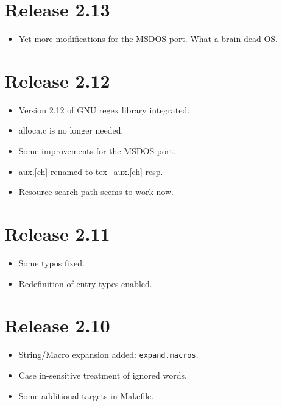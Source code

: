 \documentclass[11pt,a4paper]{scrartcl}
\newcommand\rsc[1]{\texttt{#1}}
\newcommand\File[1]{\textsf{#1}}
\newenvironment{Release}[2]{\section*{Release #1}\begin{itemize}}{\end{itemize}}
\newenvironment{Fix}[1]{\item }{}
\newenvironment{New}[1]{\item }{}
\newenvironment{Update}[1]{\item }{}
\begin{document}
 \begin{Release}{2.13}{}
  \begin{New}{gene}
    Yet more modifications for the MSDOS port. What a brain-dead OS.
  \end{New}
 \end{Release}

 \begin{Release}{2.12}{}
  \begin{Update}{gene}
    Version 2.12 of GNU regex library integrated.
  \end{Update}
  \begin{Update}{gene}
    \File{alloca.c} is no longer needed.
  \end{Update}
  \begin{Fix}{gene}
    Some improvements for the MSDOS port.
  \end{Fix}
  \begin{Fix}{gene}
    \File{aux.[ch]} renamed to \File{tex\_aux.[ch]} resp.
  \end{Fix}
  \begin{Fix}{gene}
    Resource search path seems to work now.
  \end{Fix}
 \end{Release}

 \begin{Release}{2.11}{}
  \begin{Fix}{gene}
    Some typos fixed.
  \end{Fix}
  \begin{Update}{gene}
	Redefinition of entry types enabled.
  \end{Update}
 \end{Release}

 \begin{Release}{2.10}{}
  \begin{New}{gene}
    String/Macro expansion added: \rsc{expand.macros}.
  \end{New}
  \begin{Update}{gene}
    Case in-sensitive treatment of ignored words.
  \end{Update}
  \begin{Update}{gene}
    Some additional targets in \File{Makefile}.
  \end{Update}
 \end{Release}
\end{document}
